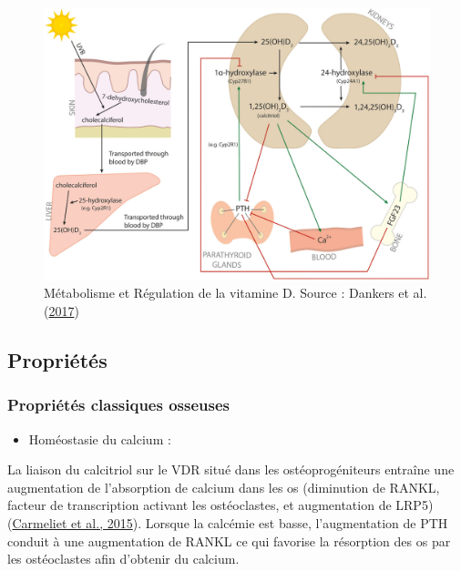\documentclass[
  letterpaper,
  DIV=11,
  numbers=noendperiod]{scrartcl}
\providecommand{\tightlist}{%
  \setlength{\itemsep}{0pt}\setlength{\parskip}{0pt}}\usepackage{longtable,booktabs,array}
\begin{document}
\begin{figure}

{\centering \includegraphics{figures/vitamin-d-metabolism-regulation.jpg}

}

\caption{\label{fig-reg-vitd}Métabolisme et Régulation de la vitamine D.
Source : Dankers et al. (\protect\hyperlink{ref-Dankers.2017}{2017})}

\end{figure}

\hypertarget{propriuxe9tuxe9s}{%
\subsection{Propriétés}\label{propriuxe9tuxe9s}}

\hypertarget{propriuxe9tuxe9s-classiques-osseuses}{%
\subsubsection{Propriétés classiques
osseuses}\label{propriuxe9tuxe9s-classiques-osseuses}}

\begin{itemize}
\tightlist
\item
  Homéostasie du calcium :
\end{itemize}

La liaison du calcitriol sur le VDR situé dans les ostéoprogéniteurs
entraîne une augmentation de l'absorption de calcium dans les os
(diminution de RANKL, facteur de transcription activant les
ostéoclastes, et augmentation de LRP5)
(\protect\hyperlink{ref-Carmeliet.2015}{Carmeliet et al., 2015}).
Lorsque la calcémie est basse, l'augmentation de PTH conduit à une
augmentation de RANKL ce qui favorise la résorption des os par les
ostéoclastes afin d'obtenir du calcium.
\end{document}
